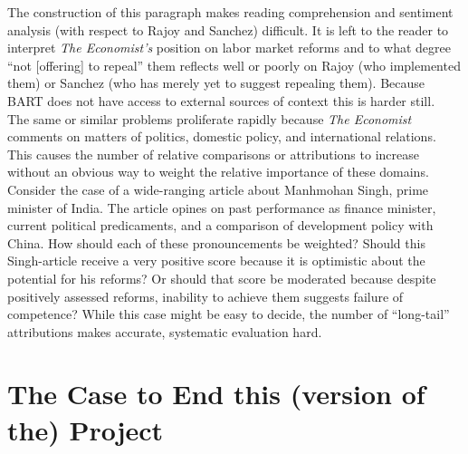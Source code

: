 \documentclass[11pt, letterpaper, twoside]{article}
\begin{document}
        The construction of this paragraph makes reading comprehension and sentiment analysis (with respect to Rajoy and Sanchez) difficult. It is left to the reader to interpret \textit{The Economist's} position on labor market reforms and to what degree ``not [offering] to repeal'' them reflects well or poorly on Rajoy (who implemented them) or Sanchez (who has merely yet to suggest repealing them). Because BART does not have access to external sources of context this is harder still.\\

        The same or similar problems proliferate rapidly because \textit{The Economist} comments on matters of politics, domestic policy, and international relations. This causes the number of relative comparisons or attributions to increase without an obvious way to weight the relative importance of these domains. Consider the case of a wide-ranging article about Manhmohan Singh, prime minister of India. The article opines on past performance as finance minister, current political predicaments, and a comparison of development policy with China. How should each of these pronouncements be weighted? Should this Singh-article receive a very positive score because it is optimistic about the potential for his reforms? Or should that score be moderated because despite positively assessed reforms, inability to achieve them suggests failure of competence? While this case might be easy to decide, the number of ``long-tail'' attributions makes accurate, systematic evaluation hard.

\section{The Case to End this (version of the) Project}
\end{document}
